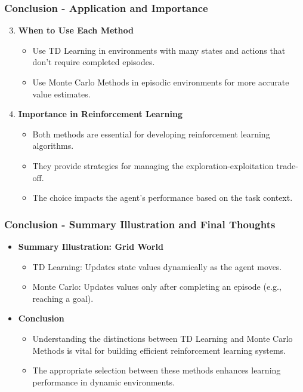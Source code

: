 \documentclass[aspectratio=169]{beamer}
\begin{document}
\begin{frame}[fragile]
    \frametitle{Conclusion - Application and Importance}
    
    \begin{enumerate}
        \setcounter{enumi}{2} %
        \item \textbf{When to Use Each Method}
        \begin{itemize}
            \item Use TD Learning in environments with many states and actions that don't require completed episodes.
            \item Use Monte Carlo Methods in episodic environments for more accurate value estimates.
        \end{itemize}

        \item \textbf{Importance in Reinforcement Learning}
        \begin{itemize}
            \item Both methods are essential for developing reinforcement learning algorithms.
            \item They provide strategies for managing the exploration-exploitation trade-off.
            \item The choice impacts the agent's performance based on the task context.
        \end{itemize}
    \end{enumerate}
\end{frame}

\begin{frame}[fragile]
    \frametitle{Conclusion - Summary Illustration and Final Thoughts}
    
    \begin{itemize}
        \item \textbf{Summary Illustration: Grid World}
        \begin{itemize}
            \item TD Learning: Updates state values dynamically as the agent moves.
            \item Monte Carlo: Updates values only after completing an episode (e.g., reaching a goal).
        \end{itemize}

        \item \textbf{Conclusion}
        \begin{itemize}
            \item Understanding the distinctions between TD Learning and Monte Carlo Methods is vital for building efficient reinforcement learning systems.
            \item The appropriate selection between these methods enhances learning performance in dynamic environments.
        \end{itemize}
    \end{itemize}
\end{frame}
\end{document}

